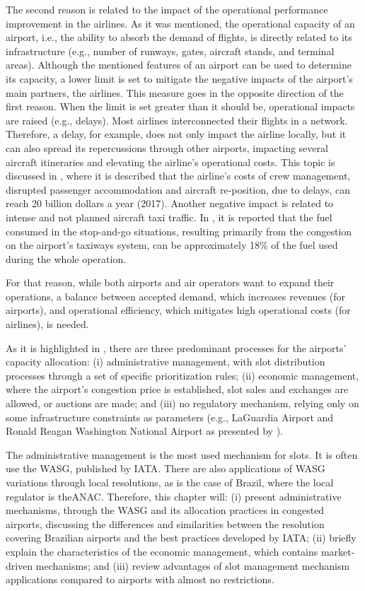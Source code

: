 The second reason is related to the impact of the operational performance improvement in the airlines. As it was mentioned, the operational capacity of an airport, i.e., the ability to absorb the demand of flights, is directly related to its infrastructure (e.g., number of runways, gates, aircraft stands, and terminal areas). Although the mentioned features of an airport can be used to determine its capacity, a lower limit is set to mitigate the negative impacts of the airport’s main partners, the airlines. This measure goes in the opposite direction of the first reason. When the limit is set greater than it should be, operational impacts are raised (e.g., delays). Most airlines interconnected their flights in a network. Therefore, a delay, for example, does not only impact the airline locally, but it can also spread its repercussions through other airports, impacting several aircraft itineraries and elevating the airline’s operational costs. This topic is discussed in \cite{ball2010total}, where it is described that the airline's costs of crew management, disrupted passenger accommodation and aircraft re-position, due to delays, can reach 20 billion dollars a year (2017). Another negative impact is related to intense and not planned aircraft taxi traffic. In \cite{nikoleris2011detailed}, it is reported that the fuel consumed in the stop-and-go situations, resulting primarily from the congestion on the airport’s taxiways system, can be approximately 18\% of the fuel used during the whole operation.

For that reason, while both airports and air operators want to expand their operations, a balance between accepted demand, which increases revenues (for airports), and operational efficiency, which mitigates high operational costs (for airlines), is needed.

As it is highlighted in \cite{cavusoglu2021minimum}, there are three predominant processes for the airports’ capacity allocation: (i) administrative management, with slot distribution processes through a set of specific prioritization rules; (ii) economic management, where the airport’s congestion price is established, slot sales and exchanges are allowed, or auctions are made; and (iii) no regulatory mechanism, relying only on some infrastructure constraints as parameters (e.g., LaGuardia Airport and Ronald Reagan Washington National Airport as presented by \cite{FAAslots}).

The administrative management is the most used mechanism for slots. It is often use the \acrfull{WASG}, published by \acrshort{IATA}\cite{ribeiro2018optimization}. There are also applications of \acrshort{WASG} variations through local resolutions, as is the case of Brazil, where the local regulator is the\acrfull{ANAC}. Therefore, this chapter will: (i) present administrative mechanisms, through the \acrshort{WASG} and its allocation practices in congested airports, discussing the differences and similarities between the resolution covering Brazilian airports and the best practices developed by \acrshort{IATA}; (ii) briefly explain the characteristics of the economic management, which contains market-driven mechanisms; and (iii) review advantages of slot management mechanism applications compared to airports with almost no restrictions.

